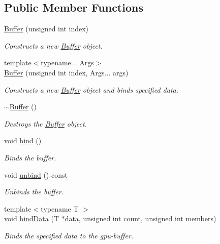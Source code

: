 \subsection*{Public Member Functions}
\begin{DoxyCompactItemize}
\item 
\hyperlink{classpcs_1_1rend_1_1Buffer_add9c4196c80605e47170fa37ad7eef50}{Buffer} (unsigned int index)
\begin{DoxyCompactList}\small\item\em Constructs a new \hyperlink{classpcs_1_1rend_1_1Buffer}{Buffer} object. \end{DoxyCompactList}\item 
{\footnotesize template$<$typename... Args$>$ }\\\hyperlink{classpcs_1_1rend_1_1Buffer_a4ac6db7b29dd6a33d1f65b0c491a033f}{Buffer} (unsigned int index, Args... args)
\begin{DoxyCompactList}\small\item\em Constructs a new \hyperlink{classpcs_1_1rend_1_1Buffer}{Buffer} object and binds specified data. \end{DoxyCompactList}\item 
\hyperlink{classpcs_1_1rend_1_1Buffer_a38bfdd852e494d21e430b2a0007021d4}{$\sim$\+Buffer} ()
\begin{DoxyCompactList}\small\item\em Destroys the \hyperlink{classpcs_1_1rend_1_1Buffer}{Buffer} object. \end{DoxyCompactList}\item 
void \hyperlink{classpcs_1_1rend_1_1Buffer_a1be9c6c19cee147e580c8d1038a664a9}{bind} ()
\begin{DoxyCompactList}\small\item\em Binds the buffer. \end{DoxyCompactList}\item 
void \hyperlink{classpcs_1_1rend_1_1Buffer_ae50fade1bf8340f6db27af4bad5a09ba}{unbind} () const
\begin{DoxyCompactList}\small\item\em Unbinds the buffer. \end{DoxyCompactList}\item 
{\footnotesize template$<$typename T $>$ }\\void \hyperlink{classpcs_1_1rend_1_1Buffer_a3e8a8fa6bbd51354ef27e86151d64022}{bind\+Data} (T $\ast$data, unsigned int count, unsigned int members)
\begin{DoxyCompactList}\small\item\em Binds the specified data to the gpu-\/buffer. \end{DoxyCompactList}\item 

\end{DoxyCompactItemize}
